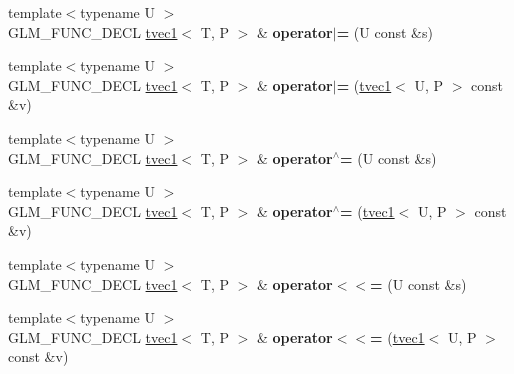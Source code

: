 \begin{DoxyCompactItemize}
\item 
\hypertarget{structglm_1_1detail_1_1tvec1_a879683e788198a53a1c4661a1b5af383}{{\footnotesize template$<$typename U $>$ }\\G\-L\-M\-\_\-\-F\-U\-N\-C\-\_\-\-D\-E\-C\-L \hyperlink{structglm_1_1detail_1_1tvec1}{tvec1}$<$ T, P $>$ \& {\bfseries operator$\vert$=} (U const \&s)}\label{structglm_1_1detail_1_1tvec1_a879683e788198a53a1c4661a1b5af383}

\item 
\hypertarget{structglm_1_1detail_1_1tvec1_a15ea891a329d3a5149263d7a9fb81b40}{{\footnotesize template$<$typename U $>$ }\\G\-L\-M\-\_\-\-F\-U\-N\-C\-\_\-\-D\-E\-C\-L \hyperlink{structglm_1_1detail_1_1tvec1}{tvec1}$<$ T, P $>$ \& {\bfseries operator$\vert$=} (\hyperlink{structglm_1_1detail_1_1tvec1}{tvec1}$<$ U, P $>$ const \&v)}\label{structglm_1_1detail_1_1tvec1_a15ea891a329d3a5149263d7a9fb81b40}

\item 
\hypertarget{structglm_1_1detail_1_1tvec1_ae48766d1c02e2946f6185eaac15737ef}{{\footnotesize template$<$typename U $>$ }\\G\-L\-M\-\_\-\-F\-U\-N\-C\-\_\-\-D\-E\-C\-L \hyperlink{structglm_1_1detail_1_1tvec1}{tvec1}$<$ T, P $>$ \& {\bfseries operator$^\wedge$=} (U const \&s)}\label{structglm_1_1detail_1_1tvec1_ae48766d1c02e2946f6185eaac15737ef}

\item 
\hypertarget{structglm_1_1detail_1_1tvec1_a03d26aae5b039d37df678fe8648efbb8}{{\footnotesize template$<$typename U $>$ }\\G\-L\-M\-\_\-\-F\-U\-N\-C\-\_\-\-D\-E\-C\-L \hyperlink{structglm_1_1detail_1_1tvec1}{tvec1}$<$ T, P $>$ \& {\bfseries operator$^\wedge$=} (\hyperlink{structglm_1_1detail_1_1tvec1}{tvec1}$<$ U, P $>$ const \&v)}\label{structglm_1_1detail_1_1tvec1_a03d26aae5b039d37df678fe8648efbb8}

\item 
\hypertarget{structglm_1_1detail_1_1tvec1_a52cec716d59902c6a42eeebd28f78de9}{{\footnotesize template$<$typename U $>$ }\\G\-L\-M\-\_\-\-F\-U\-N\-C\-\_\-\-D\-E\-C\-L \hyperlink{structglm_1_1detail_1_1tvec1}{tvec1}$<$ T, P $>$ \& {\bfseries operator$<$$<$=} (U const \&s)}\label{structglm_1_1detail_1_1tvec1_a52cec716d59902c6a42eeebd28f78de9}

\item 
\hypertarget{structglm_1_1detail_1_1tvec1_a12d03301e51ece6466714a8203f8b237}{{\footnotesize template$<$typename U $>$ }\\G\-L\-M\-\_\-\-F\-U\-N\-C\-\_\-\-D\-E\-C\-L \hyperlink{structglm_1_1detail_1_1tvec1}{tvec1}$<$ T, P $>$ \& {\bfseries operator$<$$<$=} (\hyperlink{structglm_1_1detail_1_1tvec1}{tvec1}$<$ U, P $>$ const \&v)}\label{structglm_1_1detail_1_1tvec1_a12d03301e51ece6466714a8203f8b237}


\end{DoxyCompactItemize}
